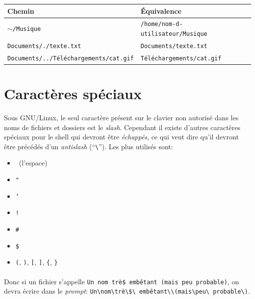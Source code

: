 \documentclass[french, a4paper, 12pt, titlepage]{article}
\begin{document}
\begin{tabular}{|l|l|}
	\hline
	\textbf{Chemin} & \textbf{Équivalence}\\
	\hline
	\texttt{$\sim$/Musique} & \texttt{/home/nom-d-utilisateur/Musique}\\
	\hline
	\texttt{Documents/./texte.txt} & \texttt{Documents/texte.txt}\\
	\hline
	\texttt{Documents/../Téléchargements/cat.gif} & \texttt{Téléchargements/cat.gif}\\
	\hline
\end{tabular}

\section{Caractères spéciaux}

\paragraph{} Sous GNU/Linux, le seul caractère présent sur le clavier non
autorisé dans les noms de fichiers et dossiers est le \emph{slash}. Cependant
il existe d'autres caractères spéciaux pour le shell qui devront être
\emph{échappés}, ce qui veut dire qu'il devront être précédés d'un
\emph{antislash} (``\texttt{\textbackslash}''). Les plus utilisés sont:

\begin{itemize}
	\item \textvisiblespace~(l'espace)
	\item \texttt{"}
	\item \texttt{'}
	\item \texttt{!}
	\item \texttt{\#}
	\item \texttt{\$}
	\item \texttt{(}, \texttt{)}, \texttt{[}, \texttt{]}, \texttt{\{}, \texttt{\}}
\end{itemize}

\paragraph{} Donc si un fichier s'appelle \texttt{Un nom trè\$ embêtant (mais
peu probable)}, on devra écrire dans le \emph{prompt}:
\texttt{Un\textbackslash{\textvisiblespace}nom\textbackslash{\textvisiblespace}trè\textbackslash\$\textbackslash\textvisiblespace
	embêtant\textbackslash{\textvisiblespace}\textbackslash(mais\textbackslash{\textvisiblespace}peu\textbackslash\textvisiblespace
probable\textbackslash)}.
\end{document}
